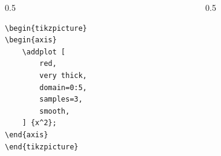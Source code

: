 \documentclass[12pt,aspectratio=169,ignorenonframetext]{ltxbeamer}
\begin{document}
\begin{frame}[fragile]
\begin{columns}
    \begin{column}{0.5\textwidth}
        \begin{verbatim}
\begin{tikzpicture}
\begin{axis}
    \addplot [
        red,
        very thick,
        domain=0:5,
        samples=3,
        smooth,
    ] {x^2};
\end{axis}
\end{tikzpicture}
        \end{verbatim}
    \end{column}
    {\color{gray} \vline}
    \begin{column}{0.5\textwidth}
    \end{column}
\end{columns}
\end{frame}
\end{document}
